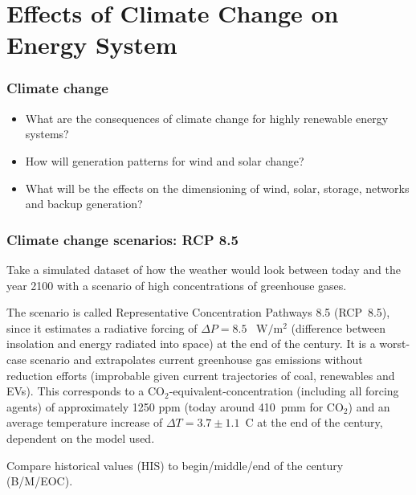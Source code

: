 \documentclass[10pt,aspectratio=169,dvipsnames]{beamer}
\let\olditem\item
\renewcommand{\item}{%
\olditem\vspace{5pt}}
\begin{document}
\section{Effects of Climate Change on Energy System}


\begin{frame}
  \frametitle{Climate change}

  \begin{itemize}
  \item   What are the consequences of climate change for highly renewable energy systems?
  \item How will generation patterns for wind and solar change?
    \item What will be the effects on the dimensioning of wind,
      solar, storage, networks and backup generation?
  \end{itemize}

\end{frame}

\begin{frame}
  \frametitle{Climate change scenarios: RCP 8.5}

  Take a simulated dataset of how the weather would look
  between today and the year 2100 with a scenario of high
  concentrations of greenhouse gases.

  The scenario is called Representative Concentration Pathways 8.5
  (RCP~8.5), since it estimates a radiative forcing of $\Delta P = 8.5$~
  $\mathrm{W}/ \mathrm{m}^2$ (difference between insolation and energy
  radiated into space) at the end of the century. It is a \alert{worst-case scenario} and extrapolates current greenhouse gas emissions
  without reduction efforts (improbable given current trajectories of coal, renewables and EVs). This corresponds to a
  CO$_2$-equivalent-concentration (including all forcing agents) of
  approximately 1250 ppm (today around 410~pmm for CO$_2$) and an
  average temperature increase of $\Delta T = 3.7 \pm 1.1$~C at the
  end of the century, dependent on the model used.

  Compare historical values (HIS) to begin/middle/end of the century (B/M/EOC).

\end{frame}
\end{document}
